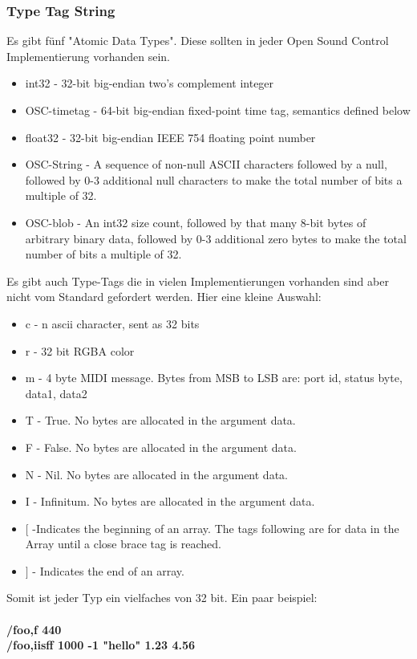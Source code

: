 \documentclass[a4paper, 12pt]{article}
\begin{document}
\subsubsection{Type Tag String}
Es gibt fünf "Atomic Data Types"\cite{OSCspec}. Diese sollten in jeder Open Sound Control Implementierung vorhanden sein.
\begin{itemize}
	\item int32 - 32-bit big-endian two's complement integer
	\item OSC-timetag - 64-bit big-endian fixed-point time tag, semantics defined below
	\item float32 - 32-bit big-endian IEEE 754 floating point number
	\item OSC-String - A sequence of non-null ASCII characters followed by a null, followed by 0-3 additional null characters to make the total number of bits a multiple of 32.
	\item OSC-blob - An int32 size count, followed by that many 8-bit bytes of arbitrary binary data, followed by 0-3 additional zero bytes to make the total number of bits a multiple of 32.
\end{itemize}
Es gibt auch Type-Tags die in vielen Implementierungen vorhanden sind aber nicht vom Standard gefordert werden. Hier eine kleine Auswahl\cite{OSCspec}:
\begin{itemize}
\item c - n ascii character, sent as 32 bits
\item r - 32 bit RGBA color
\item m - 4 byte MIDI message. Bytes from MSB to LSB are: port id, status byte, data1, data2
\item T - True. No bytes are allocated in the argument data.
\item F - False. No bytes are allocated in the argument data.
\item N - Nil. No bytes are allocated in the argument data.
\item I - Infinitum. No bytes are allocated in the argument data.
\item $ [ $  -Indicates the beginning of an array. The tags following are for data in the Array until a close brace tag is reached.
\item $ ] $ - Indicates the end of an array.
\end{itemize}

Somit ist jeder Typ ein vielfaches von 32 bit. Ein paar beispiel:\\
\\
{\bf /foo,f 440}\\
{\bf /foo,iisff 1000 -1 "hello" 1.23 4.56}\\
\end{document}
